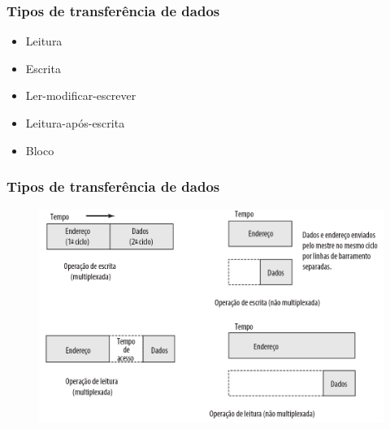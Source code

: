 \documentclass[aspectratio=169,
				xcolor=table]{beamer}
\begin{document}
	\begin{frame}
		\frametitle{Tipos de transferência de dados}
		\begin{itemize}
			\item Leitura
			\vspace{1em}
			\item Escrita
			\vspace{1em}
			\item Ler-modificar-escrever
			\vspace{1em}
			\item Leitura-após-escrita
			\vspace{1em}
			\item Bloco
		\end{itemize}
	\end{frame}
		
	\begin{frame}
		\frametitle{Tipos de transferência de dados}
		\begin{figure}[hbtp]
		\centering
		\includegraphics[height=.75\textheight]{../figs/cap11/tipo1.png}
		\end{figure}
	\end{frame}
\end{document}
